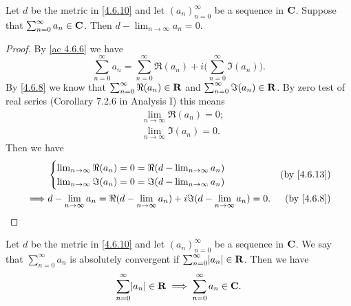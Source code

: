 \begin{additional corollary}\label{ac 4.6.7}
Let \(d\) be the metric in \cref{4.6.10} and let \((a_n)_{n = 0}^\infty\) be a sequence in \(\mathbf{C}\).
Suppose that \(\sum_{n = 0}^\infty a_n \in \mathbf{C}\).
Then \(d - \lim_{n \to \infty} a_n = 0\).
\end{additional corollary}

\begin{proof}
  By \cref{ac 4.6.6} we have
  \[
    \sum_{n = 0}^\infty a_n = \sum_{n = 0}^\infty \Re(a_n) + i \bigg(\sum_{n = 0}^\infty \Im(a_n)\bigg).
  \]
  By \cref{4.6.8} we know that \(\sum_{n = 0}^\infty \Re(a_n) \in \mathbf{R}\) and \(\sum_{n = 0}^\infty \Im(a_n) \in \mathbf{R}\).
  By zero test of real series (Corollary 7.2.6 in Analysis I) this means
  \begin{align*}
     & \lim_{n \to \infty} \Re(a_n) = 0; \\
     & \lim_{n \to \infty} \Im(a_n) = 0.
  \end{align*}
  Then we have
  \begin{align*}
             & \begin{cases}
                 \lim_{n \to \infty} \Re(a_n) = 0 = \Re(d - \lim_{n \to \infty} a_n) \\
                 \lim_{n \to \infty} \Im(a_n) = 0 = \Im(d - \lim_{n \to \infty} a_n)
               \end{cases}                                   & \text{(by \cref{4.6.13})}                                                           \\
    \implies & d - \lim_{n \to \infty} a_n = \Re(d - \lim_{n \to \infty} a_n) + i \Im(d - \lim_{n \to \infty} a_n) = 0. & \text{(by \cref{4.6.8})}
  \end{align*}
\end{proof}

\begin{additional corollary}\label{ac 4.6.8}
Let \(d\) be the metric in \cref{4.6.10} and let \((a_n)_{n = 0}^\infty\) be a sequence in \(\mathbf{C}\).
We say that \(\sum_{n = 0}^\infty a_n\) is absolutely convergent if \(\sum_{n = 0}^\infty \abs{a_n} \in \R\).
Then we have
\[
  \sum_{n = 0}^\infty \abs{a_n} \in \R \implies \sum_{n = 0}^\infty a_n \in \C.
\]
\end{additional corollary}

